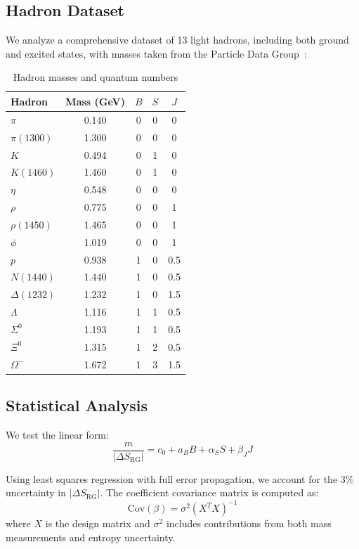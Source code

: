 \documentclass[12pt,a4paper]{article}
\begin{document}
\subsection{Hadron Dataset}

We analyze a comprehensive dataset of 13 light hadrons, including both ground and excited states, with masses taken from the Particle Data Group~\cite{PDG2022}:

\begin{table}[H]
\centering
\caption{Hadron masses and quantum numbers}
\label{tab:hadrons}
\begin{tabular}{lcccc}
\toprule
Hadron & Mass (GeV) & $B$ & $S$ & $J$ \\
\midrule
$\pi$ & 0.140 & 0 & 0 & 0 \\
$\pi(1300)$ & 1.300 & 0 & 0 & 0 \\
$K$ & 0.494 & 0 & 1 & 0 \\
$K(1460)$ & 1.460 & 0 & 1 & 0 \\
$\eta$ & 0.548 & 0 & 0 & 0 \\
$\rho$ & 0.775 & 0 & 0 & 1 \\
$\rho(1450)$ & 1.465 & 0 & 0 & 1 \\
$\phi$ & 1.019 & 0 & 0 & 1 \\
$p$ & 0.938 & 1 & 0 & 0.5 \\
$N(1440)$ & 1.440 & 1 & 0 & 0.5 \\
$\Delta(1232)$ & 1.232 & 1 & 0 & 1.5 \\
$\Lambda$ & 1.116 & 1 & 1 & 0.5 \\
$\Sigma^0$ & 1.193 & 1 & 1 & 0.5 \\
$\Xi^0$ & 1.315 & 1 & 2 & 0.5 \\
$\Omega^-$ & 1.672 & 1 & 3 & 1.5 \\
\bottomrule
\end{tabular}
\end{table}

\subsection{Statistical Analysis}

We test the linear form:
\begin{equation}
\frac{m}{|\Delta S_{\text{RG}}|} = c_0 + a_B B + \alpha_S S + \beta_J J
\end{equation}

Using least squares regression with full error propagation, we account for the 3\% uncertainty in $|\Delta S_{\text{RG}}|$. The coefficient covariance matrix is computed as:
\begin{equation}
\text{Cov}(\beta) = \sigma^2 (X^T X)^{-1}
\end{equation}
where $X$ is the design matrix and $\sigma^2$ includes contributions from both mass measurements and entropy uncertainty.
\end{document}
